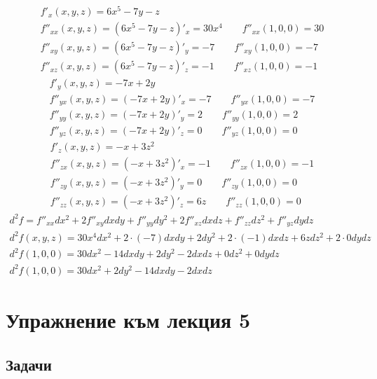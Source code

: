 \documentclass[a4paper,fleqn,12pt]{article}
\theoremstyle{definition}
\begin{document}
\begin{gather*}
f'_x(x,y,z) = 6x^5 - 7y - z\\
f''_{xx}(x,y,z) = (6x^5 - 7y - z)'_x = 30x^4 \qquad f''_{xx}(1,0,0) = 30 \\
f''_{xy}(x,y,z) = (6x^5 - 7y - z)'_y = -7 \qquad f''_{xy}(1,0,0) = -7 \\
f''_{xz}(x,y,z) = (6x^5 - 7y - z)'_z = -1 \qquad f''_{xz}(1,0,0) = -1 
\end{gather*}
\begin{gather*}
f'_y(x,y,z) = -7x + 2y\\
f''_{yx}(x,y,z) = (-7x + 2y)'_x = -7 \qquad f''_{yx}(1,0,0) = -7 \\
f''_{yy}(x,y,z) = (-7x + 2y)'_y = 2 \qquad f''_{yy}(1,0,0) = 2 \\
f''_{yz}(x,y,z) = (-7x + 2y)'_z = 0\qquad f''_{yz}(1,0,0) = 0 
\end{gather*}
\begin{gather*}
f'_z(x,y,z) = -x + 3z^2\\
f''_{zx}(x,y,z) = (-x + 3z^2)'_x = -1 \qquad f''_{zx}(1,0,0) = -1 \\
f''_{zy}(x,y,z) = (-x + 3z^2)'_y = 0 \qquad f''_{zy}(1,0,0) = 0 \\
 f''_{zz}(x,y,z) = (-x + 3z^2)'_z = 6z  \qquad f''_{zz}(1,0,0) = 0 
\end{gather*}
\begin{gather*}
d^2f = f''_{xx}dx^2 + 2f''_{xy}dxdy + f''_{yy}dy^2 + 2f''_{xz}dxdz +  f''_{zz}dz^2 + f''_{yz}dydz\\
d^2f(x,y,z) = 30x^4dx^2 +2\cdot(-7) dxdy + 2dy^2 + 2\cdot(-1)dxdz + 6zdz^2 + 2\cdot 0 dydz \\
d^2f(1,0,0) = 30dx^2 -14dxdy + 2dy^2 - 2dxdz + 0dz^2 + 0 dydz \\
d^2f(1,0,0) = 30dx^2 + 2dy^2 -14dxdy - 2dxdz 
\end{gather*}

\newpage
\section{Упражнение към лекция 5}

\subsection{Задачи}
\end{document}
